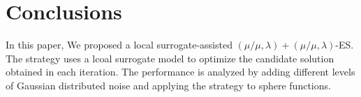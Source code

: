 		




\section{Conclusions}
In this paper, We proposed a local surrogate-assisted $(\mu/\mu,\lambda)+(\mu/\mu,\lambda)$-ES. The strategy uses a lcoal surrogate model to optimize the candidate solution obtained in each iteration. The performance is analyzed by adding different levels of Gaussian distributed noise and applying the strategy to sphere functions. 








